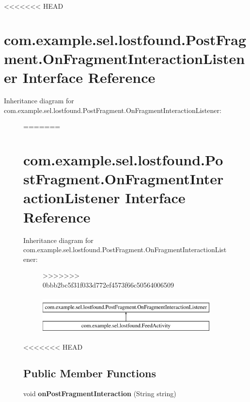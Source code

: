 <<<<<<< HEAD
\hypertarget{interfacecom_1_1example_1_1sel_1_1lostfound_1_1PostFragment_1_1OnFragmentInteractionListener}{\section{com.\-example.\-sel.\-lostfound.\-Post\-Fragment.\-On\-Fragment\-Interaction\-Listener Interface Reference}
\label{interfacecom_1_1example_1_1sel_1_1lostfound_1_1PostFragment_1_1OnFragmentInteractionListener}
}
Inheritance diagram for com.\-example.\-sel.\-lostfound.\-Post\-Fragment.\-On\-Fragment\-Interaction\-Listener\-:\begin{figure}[H]
=======
\hypertarget{interfacecom_1_1example_1_1sel_1_1lostfound_1_1PostFragment_1_1OnFragmentInteractionListener}{\section{com.\-example.\-sel.\-lostfound.\-Post\-Fragment.\-On\-Fragment\-Interaction\-Listener \-Interface \-Reference}
\label{interfacecom_1_1example_1_1sel_1_1lostfound_1_1PostFragment_1_1OnFragmentInteractionListener}
}
\-Inheritance diagram for com.\-example.\-sel.\-lostfound.\-Post\-Fragment.\-On\-Fragment\-Interaction\-Listener\-:\begin{figure}[H]
>>>>>>> 0bbb2bc5f31f033d772ef4573f66c50564006509
\begin{center}
\leavevmode
\includegraphics[height=2.000000cm]{interfacecom_1_1example_1_1sel_1_1lostfound_1_1PostFragment_1_1OnFragmentInteractionListener}
\end{center}
\end{figure}
<<<<<<< HEAD
\subsection*{Public Member Functions}
\begin{DoxyCompactItemize}
\item 
\hypertarget{interfacecom_1_1example_1_1sel_1_1lostfound_1_1PostFragment_1_1OnFragmentInteractionListener_a9ca2bef2b5bd8c3f86dd3e8f14045b17}{void {\bfseries on\-Post\-Fragment\-Interaction} (String string)}\label{interfacecom_1_1example_1_1sel_1_1lostfound_1_1PostFragment_1_1OnFragmentInteractionListener_a9ca2bef2b5bd8c3f86dd3e8f14045b17}


\end{DoxyCompactItemize}
\end{figure}
